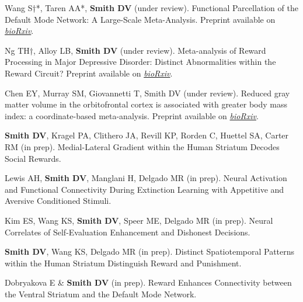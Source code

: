 \documentclass[11pt, letterpaper]{article}
\newcommand{\biorxiv}[1]{\href{#1}{\textit{bioRxiv}}}
\begin{document}
\begin{hangparas}{.5in}{1}

Wang S†*, Taren AA*, \textbf{Smith DV} (under review). Functional Parcellation of the Default Mode Network: A Large-Scale Meta-Analysis. Preprint available on \biorxiv{https://www.biorxiv.org/content/early/2017/11/27/225375}.

Ng TH†, Alloy LB, \textbf{Smith DV} (under review). Meta-analysis of Reward Processing in Major Depressive Disorder: Distinct Abnormalities within the Reward Circuit? Preprint available on \biorxiv{https://www.biorxiv.org/content/early/2018/05/29/332981}.

Chen EY, Murray SM, Giovannetti T, Smith DV (under review). Reduced gray matter volume in the orbitofrontal cortex is associated with greater body mass index: a coordinate-based meta-analysis. Preprint available on \biorxiv{https://www.biorxiv.org/content/early/2018/06/30/359919}.

\textbf{Smith DV}, Kragel PA, Clithero JA, Revill KP, Rorden C, Huettel SA, Carter RM (in prep). Medial-Lateral Gradient within the Human Striatum Decodes Social Rewards.

Lewis AH, \textbf{Smith DV}, Manglani H, Delgado MR (in prep). Neural Activation and Functional Connectivity During Extinction Learning with Appetitive and Aversive Conditioned Stimuli.

Kim ES, Wang KS, \textbf{Smith DV}, Speer ME, Delgado MR (in prep). Neural Correlates of Self-Evaluation Enhancement and Dishonest Decisions.

\textbf{Smith DV}, Wang KS, Delgado MR (in prep). Distinct Spatiotemporal Patterns within the Human Striatum Distinguish Reward and Punishment.

Dobryakova E \& \textbf{Smith DV} (in prep). Reward Enhances Connectivity between the Ventral Striatum and the Default Mode Network.


\end{hangparas}


\vspace{.4cm}
\end{document}
